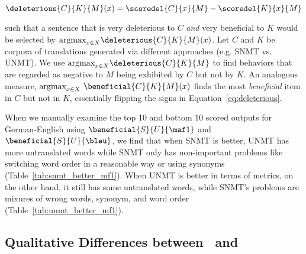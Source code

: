 
\begin{equation}
\deleterious{C}{K}{M}(x) = \scoredel{C}{x}{M} - \scoredel{K}{x}{M}
\label{eq:deleterious}
\end{equation}

\noindent such that a sentence that is very deleterious to $C$ \textit{and} very beneficial to $K$ would be selected by $\mbox{argmax}_{x \in X}\deleterious{C}{K}{M}(x)$.
Let $C$ and $K$ be corpora of translations generated via different approaches (e.g. SNMT vs. UNMT). 
We use $\mbox{argmax}_{x \in X}\deleterious{C}{K}{M}$ to find behaviors that are regarded as negative to $M$ being exhibited by $C$ but not by $K$.
An analogous measure, $\mbox{argmax}_{x \in X}\ \beneficial{C}{K}{M}(x)$ finds the most \textit{beneficial} item in $C$ but not in $K$, essentially flipping the signs in Equation~\ref{eq:deleterious}.


When we manually examine the top 10 and bottom 10 scored outputs for German-English using $\beneficial{S}{U}{\maf1}$ and $\beneficial{S}{U}{\bleu}$, we find that when SNMT is better, UNMT has more untranslated words while SNMT only has non-important problems like switching word order in a reasonable way or using synonyms (Table~\ref{tab:snmt_better_mf1}). When UNMT is better in terms of metrics, on the other hand, it still has some untranslated words, while SNMT's problems are mixures of wrong words, synonym, and word order (Table~\ref{tab:unmt_better_mf1}).

\subsection{Qualitative Differences between \bleu\ and }





